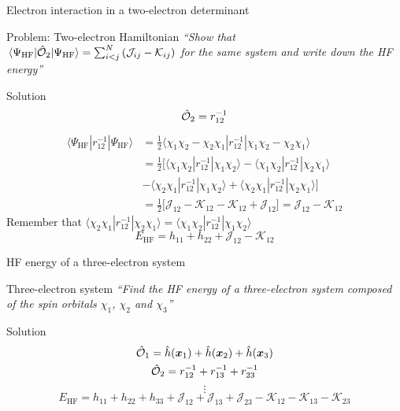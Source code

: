 \documentclass[aspectratio=169,9pt]{beamer}
\newcommand{\bx}{\boldsymbol{x}}
\newcommand{\hh}{\hat{h}}
\newcommand{\chO}{\Hat{\mathcal{O}}}
\newcommand{\cJ}{\mathcal{J}}
\newcommand{\cK}{\mathcal{K}}
\newcommand{\violet}[1]{\textcolor{hfViolet}{#1}}
\begin{document}
\begin{frame}{Electron interaction in a two-electron determinant}
	\begin{block}{Problem: Two-electron Hamiltonian}
		\textit{\violet{``Show that $ \mel{\Psi_\text{HF}}{\chO_2}{\Psi_\text{HF}}  =  \sum_{i<j}^N \qty( \cJ_{ij} - \cK_{ij} )$ for the same system and write down the HF energy''}}
	\end{block}
	\pause
	\begin{block}{Solution}
		\small
		\begin{equation*}
			\chO_2 =r_{12}^{-1}
		\end{equation*}
		\begin{equation*}
		\begin{split}
			\langle \Psi_\text{HF} | r_{12}^{-1} | \Psi_\text{HF} \rangle 
			&  = \frac{1}{2} \langle \chi_1 \chi_2 -  \chi_2 \chi_1 | r_{12}^{-1} | \chi_1 \chi_2 -  \chi_2 \chi_1 \rangle
			\\
			&   = \frac{1}{2} \Big[ 
			\langle \chi_1 \chi_2  | r_{12}^{-1} | \chi_1 \chi_2  \rangle
			- \langle \chi_1 \chi_2  | r_{12}^{-1} |  \chi_2 \chi_1 \rangle
			\\
			&   - \langle  \chi_2 \chi_1 | r_{12}^{-1} | \chi_1 \chi_2  \rangle
			+ \langle  \chi_2 \chi_1 | r_{12}^{-1} |  \chi_2 \chi_1 \rangle
			\Big]
			\\
			&   =  \frac{1}{2} \Big[ \cJ_{12} - \cK_{12} - \cK_{12} + \cJ_{12} \Big] = \cJ_{12} - \cK_{12}
		\end{split}
		\end{equation*}
		\alert{Remember that $\langle  \chi_2 \chi_1 | r_{12}^{-1} |  \chi_2 \chi_1 \rangle = \langle  \chi_1 \chi_2 | r_{12}^{-1} |  \chi_1 \chi_2 \rangle$}
		\begin{equation*}
			\boxed{E_\text{HF} = h_{11} + h_{22} + \cJ_{12} - \cK_{12}}
		\end{equation*}
	\end{block}
\end{frame}

\begin{frame}{HF energy of a three-electron system}
	\begin{block}{Three-electron system}
		\textit{\violet{``Find the HF energy of a three-electron system composed of the spin orbitals $\chi_1$, $\chi_2$ and $\chi_3$''}}
	\end{block}
	\pause
	\begin{block}{Solution}
		\begin{gather*}
			\chO_1 = \hh(\bx_1) + \hh(\bx_2) + \hh(\bx_3)
			\\
			\chO_2 =r_{12}^{-1} + r_{13}^{-1} + r_{23}^{-1}
		\end{gather*}
		$$ \vdots $$
		\begin{equation*}
			\boxed{E_\text{HF} = h_{11} + h_{22} + h_{33} + \cJ_{12} + \cJ_{13} + \cJ_{23} - \cK_{12} - \cK_{13} - \cK_{23}}
		\end{equation*}
	\end{block}
\end{frame}
\end{document}
